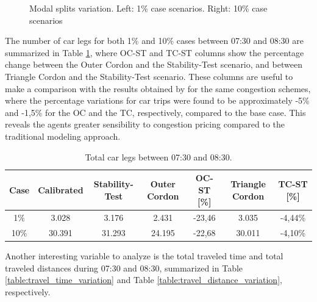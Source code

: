 \documentclass[Journal,letterpaper]{ascelike-new}
\begin{document}
\begin{figure}[h!]
	\caption{Modal splits variation. Left: 1\% case scenarios. Right: 10\% case scenarios}
	\label{fig:modal_split_results}
\end{figure}

The number of car legs for both 1\% and 10\% cases between 07:30 and 08:30 are summarized in Table \ref{table:legs_variation}, where OC-ST and TC-ST columns show the percentage change between the Outer Cordon and the Stability-Test scenario, and between Triangle Cordon and the Stability-Test scenario. These columns are useful to make a comparison with the results obtained by \cite{gleave2009tarificacion} for the same congestion schemes, where the percentage variations for car trips were found to be approximately -5\% and -1,5\% for the OC and the TC, respectively, compared to the base case. This reveals the agents greater sensibility to congestion pricing compared to the traditional modeling approach.

\begin{table}[h!]
	\centering
	\caption{Total car legs between 07:30 and 08:30.}
	\label{table:legs_variation}
	\begin{tabular}{ccc|cc|cc}
		\hline
		Case	& Calibrated & Stability-Test & Outer Cordon & OC-ST [\%] & Triangle Cordon & TC-ST [\%] \\
		\hline
		 1\%  & 3.028  & 3.176  & 2.431  & -23,46 & 3.035  & -4,44\% \\
		 10\% & 30.391 & 31.293 & 24.195 & -22,68 & 30.011 & -4,10\% \\
		\hline          
	\end{tabular}
\end{table}
Another interesting variable to analyze is the total traveled time and total traveled distances during 07:30 and 08:30, summarized in Table \ref{table:travel_time_variation} and Table \ref{table:travel_distance_variation}, respectively.
\end{document}
